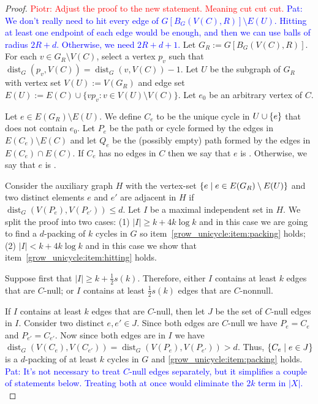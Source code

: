 \documentclass{patmorin}
\newcommand{\pat}[1]{\textcolor{Blue}{Pat: #1}}
\newcommand{\piotr}[1]{\textcolor{red}{Piotr: #1}}
\DeclareMathOperator{\dist}{dist}
\DeclarePairedDelimiter\set{\{}{\}}
\begin{document}
\begin{proof}
\piotr{Adjust the proof to the new statement. Meaning cut cut cut.} \pat{We don't really need to hit every edge of $G[B_G(V(C),R)]\setminus E(U)$.  Hitting at least one endpoint of each edge would be enough, and then we can use balls of radius $2R+d$. Otherwise, we need $2R+d+1$.}
  Let $G_{R}:=G[B_G(V(C),R)]$.
  For each $v\in G_{R}\setminus V(C)$, select a vertex $p_v$ 
  such that $\dist_G(p_v,V(C))=\dist_G(v,V(C))-1$.
  Let $U$ 
  be the subgraph of $G_{R}$ with vertex set $V(U):=V(G_{R})$ and edge set $E(U):=E(C)\cup\{vp_v:v\in V(U)\setminus V(C)\}$.  Let $e_0$ be an arbitrary vertex of $C$.  

  Let $e\in E(G_{R})\setminus E(U)$.
  We define $C_e$ to be the unique cycle in $U\cup \set{e}$ that does not contain $e_0$.
  Let $P_{e}$ be the path or cycle formed by the edges in $E(C_{e})\setminus E(C)$ and let $Q_{e}$ be the (possibly empty) path formed by the edges in $E(C_{e})\cap E(C)$.  
  If $C_e$ has no edges in $C$ then we say that $e$ is .
  Otherwise, we say that $e$ is .
  
  Consider the auxiliary graph $H$ with the vertex-set $\set{e\mid e\in E(G_{R})\setminus E(U)}$ and two distinct elements $e$ and $e'$ are adjacent in $H$ if $\dist_G(V(P_{e}),V(P_{e'})) \le d$.  Let $I$ be a maximal independent set in $H$. 
  We split the proof into two cases: 
  (1) $|I|\ge k+4k\log k$ and in this case we are going to find a $d$-packing of $k$ cycles in $G$ so item~\cref{grow_unicycle:item:packing} holds;
  (2) $|I|< k+4k\log k$ and in this case we show that item~\cref{grow_unicycle:item:hitting} holds.

  
  Suppose first that $|I|\ge k+\frac{1}{2}s(k)$.
  Therefore,
  either $I$ contains at least $k$ edges that are $C$-null;
  or $I$ contains at least $\frac{1}{2}s(k)$ edges that are $C$-nonnull.

  If $I$ contains at least $k$ edges that are $C$-null, then let $J$ be the set of $C$-null edges in $I$.
  Consider two distinct $e,e'\in J$.
  Since both edges are $C$-null we have $P_e=C_e$ and $P_{e'}=C_{e'}$.
  Now since both edges are in $I$ we have $\dist_G(V(C_e),V(C_{e'}))=\dist_G(V(P_e),V(P_{e'}))>d$. 
  Thus, $\set{C_e \mid e\in J}$ is a $d$-packing of at least $k$ cycles in $G$ and \eqref{grow_unicycle:item:packing} holds.  \pat{It's not necessary to treat $C$-null edges separately, but it simplifies a couple of statements below. Treating both at once would eliminate the $2k$ term in $|X|$. }


\end{proof}
\end{document}
